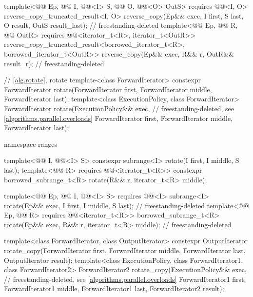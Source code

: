\begin{codeblock}
{{    template<@@ Ep, @@ I, @@<I> S,
             @@ O, @@<O> OutS>
      requires @@<I, O>
      reverse_copy_truncated_result<I, O>
        reverse_copy(Ep&& exec, I first, S last, O result,
                     OutS result_last);                         // freestanding-deleted
    template<@@ Ep, @@ R, @@ OutR>
      requires @@<iterator_t<R>, iterator_t<OutR>>
      reverse_copy_truncated_result<borrowed_iterator_t<R>, borrowed_iterator_t<OutR>>
        reverse_copy(Ep&& exec, R&& r, OutR&& result_r);        // freestanding-deleted
  }

  // \ref{alg.rotate}, rotate
  template<class ForwardIterator>
    constexpr ForwardIterator rotate(ForwardIterator first,
                                     ForwardIterator middle,
                                     ForwardIterator last);
  template<class ExecutionPolicy, class ForwardIterator>
    ForwardIterator rotate(ExecutionPolicy&& exec,              // freestanding-deleted, see \ref{algorithms.parallel.overloads}
                           ForwardIterator first,
                           ForwardIterator middle,
                           ForwardIterator last);

  namespace ranges {
    template<@@ I, @@<I> S>
      constexpr subrange<I> rotate(I first, I middle, S last);
    template<@@ R>
      requires @@<iterator_t<R>>
      constexpr borrowed_subrange_t<R> rotate(R&& r, iterator_t<R> middle);

    template<@@ Ep, @@ I, @@<I> S>
      requires @@<I>
      subrange<I>
        rotate(Ep&& exec, I first, I middle, S last);           // freestanding-deleted
    template<@@ Ep, @@ R>
      requires @@<iterator_t<R>>
      borrowed_subrange_t<R>
        rotate(Ep&& exec, R&& r, iterator_t<R> middle);         // freestanding-deleted
  }

  template<class ForwardIterator, class OutputIterator>
    constexpr OutputIterator
      rotate_copy(ForwardIterator first, ForwardIterator middle,
                  ForwardIterator last, OutputIterator result);
  template<class ExecutionPolicy, class ForwardIterator1, class ForwardIterator2>
    ForwardIterator2
      rotate_copy(ExecutionPolicy&& exec,                       // freestanding-deleted, see \ref{algorithms.parallel.overloads}
                  ForwardIterator1 first, ForwardIterator1 middle,
                  ForwardIterator1 last, ForwardIterator2 result);

}
\end{codeblock}
